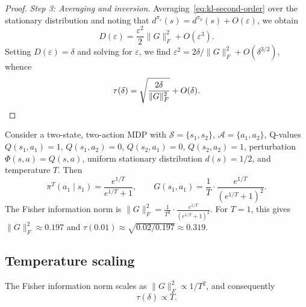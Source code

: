 \begin{proof}
\emph{Step 3: Averaging and inversion.}
Averaging~\eqref{eq:kl-second-order} over the stationary distribution and
noting that $d^{\pi_\varepsilon}(s) = d^{\pi_0}(s) + O(\varepsilon)$, we
obtain
\[
D(\varepsilon) = \frac{\varepsilon^2}{2} \lVert G \rVert_F^2
  + O(\varepsilon^3).
\]
Setting $D(\varepsilon) = \delta$ and solving for $\varepsilon$, we find
$\varepsilon^2 = 2\delta / \lVert G \rVert_F^2 + O(\delta^{3/2})$, whence
\[
\tau(\delta) = \sqrt{\frac{2\delta}{\lVert G \rVert_F^2}} + O(\delta).
\qedhere
\]
\end{proof}

\begin{example}\label{ex:two-state}
Consider a two-state, two-action MDP with $\mathcal{S} = \{s_1, s_2\}$,
$\mathcal{A} = \{a_1, a_2\}$, Q-values $Q(s_1, a_1) = 1$, $Q(s_1, a_2) = 0$,
$Q(s_2, a_1) = 0$, $Q(s_2, a_2) = 1$, perturbation $\Phi(s,a) = Q(s,a)$,
uniform stationary distribution $d(s) = 1/2$, and temperature $T$. Then
\[
\pi^T(a_1 \mid s_1) = \frac{e^{1/T}}{e^{1/T} + 1}, \qquad
G(s_1, a_1) = \frac{1}{T} \cdot \frac{e^{1/T}}{(e^{1/T}+1)^2}.
\]
The Fisher information norm is
$\lVert G \rVert_F^2 = \frac{1}{T^2} \cdot \frac{e^{1/T}}{(e^{1/T}+1)^2}$.
For $T = 1$, this gives $\lVert G \rVert_F^2 \approx 0.197$ and
$\tau(0.01) \approx \sqrt{0.02/0.197} \approx 0.319$.
\end{example}

\subsection{Temperature scaling}

\begin{corollary}\label{cor:temperature}
The Fisher information norm scales as $\lVert G \rVert_F^2 \propto 1/T^2$,
and consequently
\begin{equation}\label{eq:temp-scaling}
\tau(\delta) \propto T.
\end{equation}
\end{corollary}

